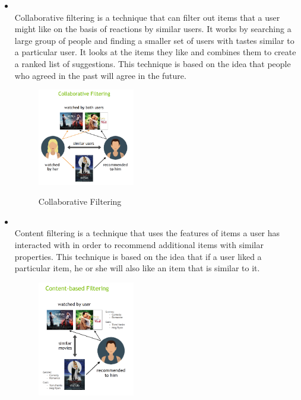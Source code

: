 \begin{itemize}
    \item {}\\Collaborative filtering is a technique that can filter out items that a user might like on the basis of reactions by similar users. It works by searching a large group of people and finding a smaller set of users with tastes similar to a particular user. It looks at the items they like and combines them to create a ranked list of suggestions. This technique is based on the idea that people who agreed in the past will agree in the future.
    \begin{figure}[H]
        \centering
        \includegraphics[width=0.4\textwidth]{assets/collaborative_filtering.png}
        \caption{Collaborative Filtering}
        \label{fig:collaborative-filtering}
        \cite{NvidiaRecSys}
    \end{figure}
    \item {}\\Content filtering is a technique that uses the features of items a user has interacted with in order to recommend additional items with similar properties. This technique is based on the idea that if a user liked a particular item, he or she will also like an item that is similar to it. 
    \begin{figure}[H]
        \centering
        \includegraphics[width=0.4\textwidth]{assets/content_based_filtering.png}

\end{figure}
\end{itemize}
